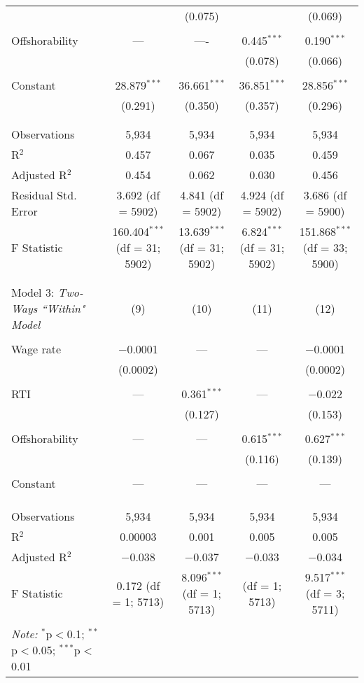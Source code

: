 \documentclass[12pt]{article}
\begin{document}
\begin{table}[!htbp]
\begin{tabular}{@{\extracolsep{5pt}}lcccc}
  & & (0.075) & & (0.069) \\ 
  & & & & \\ 
 Offshorability & --- & ---- & 0.445$^{***}$ & 0.190$^{***}$ \\ 
  & & & (0.078) & (0.066) \\ 
  & & & & \\ 
 Constant & 28.879$^{***}$ & 36.661$^{***}$ & 36.851$^{***}$ & 28.856$^{***}$ \\ 
  & (0.291) & (0.350) & (0.357) & (0.296) \\ 
 & & & & \\
\hline \\[-1.8ex] 
Observations & 5,934 & 5,934 & 5,934 & 5,934 \\ 
R$^{2}$ & 0.457 & 0.067 & 0.035 & 0.459 \\ 
Adjusted R$^{2}$ & 0.454 & 0.062 & 0.030 & 0.456 \\
Residual Std.  Error & 3.692 (df = 5902) & 4.841 (df = 5902) & 4.924 (df = 5902) & 3.686 (df = 5900) \\
F Statistic & 160.404$^{***}$ (df = 31; 5902) & 13.639$^{***}$ (df = 31; 5902) & 6.824$^{***}$ (df = 31; 5902) & 151.868$^{***}$ (df = 33; 5900) \\
\hline 
\hline \\[-1.8ex]  
\\[-1.8ex] Model 3: \textit{Two-Ways ``Within" Model} & (9) & (10) & (11) & (12) \\
\hline \\[-1.8ex]
Wage rate & $-$0.0001 & --- & --- & $-$0.0001 \\ 
  & (0.0002) & & & (0.0002) \\ 
  & & & & \\ 
 RTI & --- & 0.361$^{***}$ & --- & $-$0.022 \\ 
  & & (0.127) & & (0.153) \\ 
  & & & & \\ 
 Offshorability & --- & --- & 0.615$^{***}$ & 0.627$^{***}$ \\ 
  & & & (0.116) & (0.139) \\ 
  & & & & \\ 
 Constant & --- & --- & --- & --- \\ 
  & & & & \\ 
 & & & & \\
\hline \\[-1.8ex] 
Observations & 5,934 & 5,934 & 5,934 & 5,934 \\ 
R$^{2}$ & 0.00003 & 0.001 & 0.005 & 0.005 \\ 
Adjusted R$^{2}$ & $-$0.038 & $-$0.037 & $-$0.033 & $-$0.034 \\
F Statistic & 0.172 (df = 1; 5713) & 8.096$^{***}$ (df = 1; 5713) & (df = 1; 5713) & 9.517$^{***}$ (df = 3; 5711) \\ 
\hline 
\hline \\[-1.8ex] 
\textit{Note:} $^{*}$p$<$0.1; $^{**}$p$<$0.05; $^{***}$p$<$0.01 & & & \\ 
\end{tabular} 
\end{table}
\end{document}
